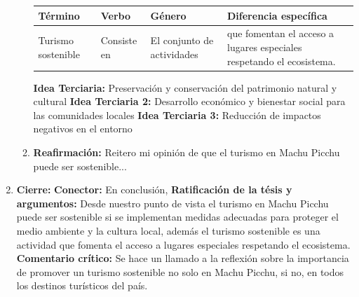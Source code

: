 \documentclass{article}
\begin{document}
\begin{center}
\begin{enumerate}
\begin{enumerate}
\begin{center}
  \renewcommand{\arraystretch}{1.2} %
  \begin{tabular}{|>{\centering\arraybackslash}p{3cm}|>{\centering\arraybackslash}p{3cm}|>{\centering\arraybackslash}p{3cm}|>{\centering\arraybackslash}p{4cm}|} %
    \hline
    \textbf{Término} & \textbf{Verbo} & \textbf{Género} & \textbf{Diferencia específica} \\
    \hline
    Turismo sostenible & Consiste en & El conjunto de actividades & que fomentan el acceso a lugares especiales respetando el ecosistema. \\
    \hline
  \end{tabular}
\end{center}
      \subitem \textbf{Idea Terciaria:} Preservación y conservación del patrimonio natural y cultural
      \subitem \textbf{Idea Terciaria 2:} Desarrollo económico y bienestar social para las comunidades locales
      \subitem \textbf{Idea Terciaria 3:} Reducción de impactos negativos en el entorno
      \item \textbf{Reafirmación:} Reitero mi opinión de que el turismo en Machu Picchu puede ser sostenible...
    \end{enumerate}
    \item \textbf{Cierre:}
    \subitem \textbf{Conector:} En conclusión,
    \subitem \textbf{Ratificación de la tésis y argumentos:} Desde nuestro punto de vista el turismo en Machu Picchu puede ser sostenible si se implementan medidas adecuadas para proteger el medio ambiente y la cultura local, además el turismo sostenible es una actividad que fomenta el acceso a lugares especiales respetando el ecosistema.
    \subitem \textbf{Comentario crítico:} Se hace un llamado a la reflexión sobre la importancia de promover un turismo sostenible no solo en Machu Picchu, si no, en todos los destinos turísticos del país.
  \end{enumerate}
\end{center}
  
\end{document}
